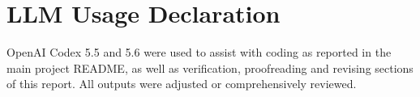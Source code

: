 \ifpdf
    \graphicspath{{Sections/7_appendix_llms_figs/Raster/}{Sections/7_appendix_llms_figs/PDF/}{Sections/7_appendix_llms_figs/}}
\else
    \graphicspath{{Sections/7_appendix_llms_figs/Vector/}{Sections/7_appendix_llms_figs/}}
\fi

\chapter{LLM Usage Declaration} 

OpenAI Codex 5.5 and 5.6 were used to assist with coding as reported in the main project README, as well as verification, proofreading and revising sections of this report. All outputs were adjusted or comprehensively reviewed.
